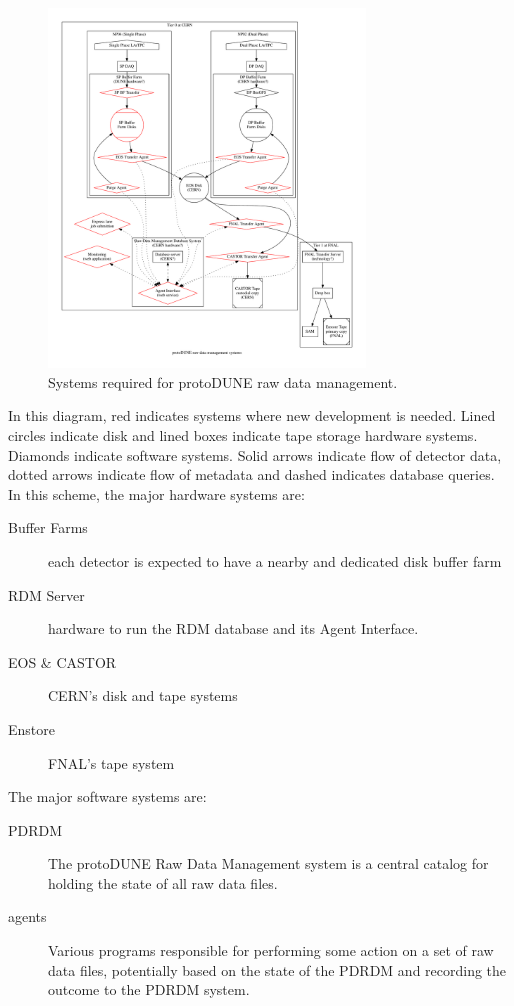 \documentclass[pdftex,12pt,letter]{article}
\begin{document}
\begin{figure}[h]
  \centering
  \includegraphics[width=0.75\textwidth]{flow.pdf}
  \caption{Systems required for protoDUNE raw data management.}
  \label{fig:flow}
\end{figure}

\noindent
In this diagram, red indicates systems where new development is needed.  Lined circles indicate disk and lined boxes indicate
tape storage hardware systems. Diamonds indicate software systems.  Solid arrows indicate flow of detector data, dotted
arrows indicate flow of metadata and dashed indicates database queries. In this scheme, the major hardware systems are:

\begin{description}
\item[Buffer Farms] each detector is expected to have a nearby and
  dedicated disk buffer farm
\item[RDM Server] hardware to run the RDM database and its Agent Interface.
\item[EOS \& CASTOR] CERN's disk and tape systems
\item[Enstore] FNAL's tape system

\end{description}

\noindent The major software systems are:

\begin{description}
\item[PDRDM] The protoDUNE Raw Data Management system is a central
  catalog for holding the state of all raw data files.
\item[agents] Various programs responsible for performing some action
  on a set of raw data files, potentially based on the state of the
  PDRDM and recording the outcome to the PDRDM system.
\end{description}
\end{document}
